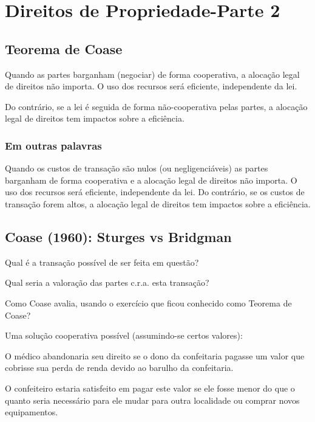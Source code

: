 \documentclass[a4paper,12pt]{article}[abntex2]
\begin{document}
\section{\textbf{Direitos de Propriedade-Parte 2}}
\subsection{\textbf{Teorema de Coase}}
Quando as partes barganham (negociar) de forma cooperativa, a alocação legal de direitos não importa. O uso dos recursos será eficiente, independente da lei.

Do contrário, se a lei é seguida de forma não-cooperativa pelas partes, a alocação legal de direitos tem impactos sobre a eficiência.

\subsubsection{\textbf{Em outras palavras}}
Quando os custos de transação são nulos (ou negligenciáveis) as partes barganham de forma cooperativa e a alocação legal de direitos não importa. O uso dos recursos será eficiente, independente da lei.
Do contrário, se os custos de transação forem altos, a alocação legal de direitos tem impactos sobre a eficiência. 
\subsection{\textbf{Coase (1960): Sturges vs Bridgman}}
Qual é a transação possível de ser feita em questão?

Qual seria a valoração das partes c.r.a. esta transação?

Como Coase avalia, usando o exercício que ficou conhecido como Teorema de Coase?

Uma solução cooperativa possível (assumindo-se certos valores):

O médico abandonaria seu direito se o dono da confeitaria pagasse um valor que cobrisse sua perda de renda devido ao barulho da confeitaria.

O confeiteiro estaria satisfeito em pagar este valor se ele fosse menor do que o quanto seria necessário para ele mudar para outra localidade ou comprar novos equipamentos.
\end{document}
